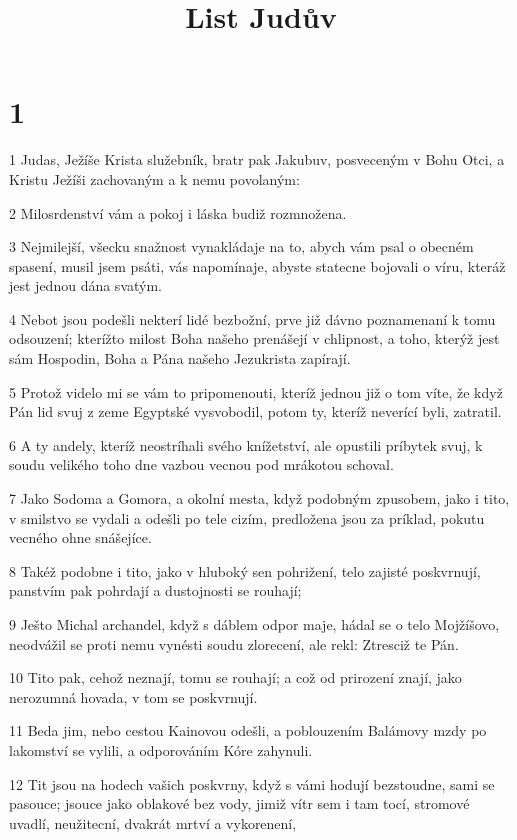

\title{List Judův}

\chapter{1}

\par 1 Judas, Ježíše Krista služebník, bratr pak Jakubuv, posveceným v Bohu Otci, a Kristu Ježíši zachovaným a k nemu povolaným:
\par 2 Milosrdenství vám a pokoj i láska budiž rozmnožena.
\par 3 Nejmilejší, všecku snažnost vynakládaje na to, abych vám psal o obecném spasení, musil jsem psáti, vás napomínaje, abyste statecne bojovali o víru, kteráž jest jednou dána svatým.
\par 4 Nebot jsou podešli nekterí lidé bezbožní, prve již dávno poznamenaní k tomu odsouzení; kterížto milost Boha našeho prenášejí v chlipnost, a toho, kterýž jest sám Hospodin, Boha a Pána našeho Jezukrista zapírají.
\par 5 Protož videlo mi se vám to pripomenouti, kteríž jednou již o tom víte, že když Pán lid svuj z zeme Egyptské vysvobodil, potom ty, kteríž neverící byli, zatratil.
\par 6 A ty andely, kteríž neostríhali svého knížetství, ale opustili príbytek svuj, k soudu velikého toho dne vazbou vecnou pod mrákotou schoval.
\par 7 Jako Sodoma a Gomora, a okolní mesta, když podobným zpusobem, jako i tito, v smilstvo se vydali a odešli po tele cizím, predložena jsou za príklad, pokutu vecného ohne snášejíce.
\par 8 Takéž podobne i tito, jako v hluboký sen pohrižení, telo zajisté poskvrnují, panstvím pak pohrdají a dustojnosti se rouhají;
\par 9 Ješto Michal archandel, když s dáblem odpor maje, hádal se o telo Mojžíšovo, neodvážil se proti nemu vynésti soudu zlorecení, ale rekl: Ztresciž te Pán.
\par 10 Tito pak, cehož neznají, tomu se rouhají; a což od prirození znají, jako nerozumná hovada, v tom se poskvrnují.
\par 11 Beda jim, nebo cestou Kainovou odešli, a poblouzením Balámovy mzdy po lakomství se vylili, a odporováním Kóre zahynuli.
\par 12 Tit jsou na hodech vašich poskvrny, když s vámi hodují bezstoudne, sami se pasouce; jsouce jako oblakové bez vody, jimiž vítr sem i tam tocí, stromové uvadlí, neužitecní, dvakrát mrtví a vykorenení,
